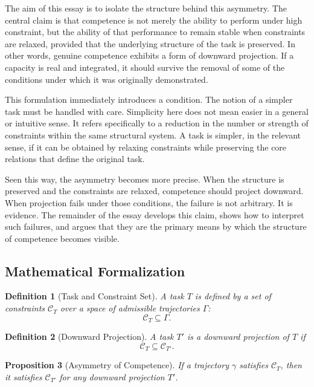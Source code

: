 \documentclass[12pt, a4paper]{article}
\newtheorem{definition}{Definition}[section]
\newtheorem{proposition}[definition]{Proposition}
\begin{document}
The aim of this essay is to isolate the structure behind this asymmetry. The central claim is that competence is not merely the ability to perform under high constraint, but the ability of that performance to remain stable when constraints are relaxed, provided that the underlying structure of the task is preserved. In other words, genuine competence exhibits a form of downward projection. If a capacity is real and integrated, it should survive the removal of some of the conditions under which it was originally demonstrated.

This formulation immediately introduces a condition. The notion of a simpler task must be handled with care. Simplicity here does not mean easier in a general or intuitive sense. It refers specifically to a reduction in the number or strength of constraints within the same structural system. A task is simpler, in the relevant sense, if it can be obtained by relaxing constraints while preserving the core relations that define the original task.

Seen this way, the asymmetry becomes more precise. When the structure is preserved and the constraints are relaxed, competence should project downward. When projection fails under those conditions, the failure is not arbitrary. It is evidence. The remainder of the essay develops this claim, shows how to interpret such failures, and argues that they are the primary means by which the structure of competence becomes visible.

\subsection*{Mathematical Formalization}

\begin{definition}[Task and Constraint Set]
A task $T$ is defined by a set of constraints $\mathcal{C}_T$ over a space of admissible trajectories $\Gamma$:
\[
\mathcal{C}_T \subseteq \Gamma.
\]
\end{definition}

\begin{definition}[Downward Projection]
A task $T'$ is a downward projection of $T$ if
\[
\mathcal{C}_T \subseteq \mathcal{C}_{T'}.
\]
\end{definition}

\begin{proposition}[Asymmetry of Competence]
If a trajectory $\gamma$ satisfies $\mathcal{C}_T$, then it satisfies $\mathcal{C}_{T'}$ for any downward projection $T'$.
\end{proposition}
\end{document}
